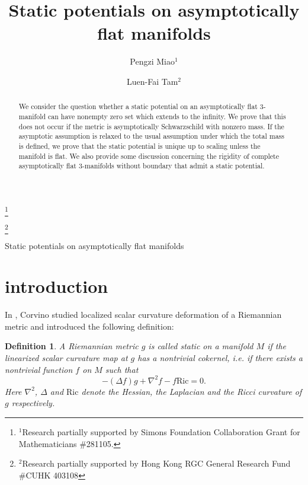 \documentclass[12pt]{amsart}
\newtheorem{definition}{Definition}
\theoremstyle{remark}
\numberwithin{equation}{section}
\newcommand{\Ric}{\mbox{Ric}}
\newcommand{\be}{\begin{equation}}
\newcommand{\ee}{\end{equation}}
\begin{document}
\title[]{Static potentials on asymptotically \\
flat manifolds}

\author{Pengzi Miao$^1$}
\address[Pengzi Miao]{Department of Mathematics, University of Miami, Coral Gables, FL 33146, USA.}
\thanks{$^1$Research partially supported by Simons Foundation Collaboration Grant for Mathematicians \#281105.}

\author{Luen-Fai Tam$^2$}
\address[Luen-Fai Tam]{The Institute of Mathematical Sciences and Department of
 Mathematics, The Chinese University of Hong Kong, Shatin, Hong Kong, China.}
\thanks{$^2$Research partially supported by Hong Kong RGC General Research Fund  \#CUHK 403108}

\renewcommand{\subjclassname}{
  \textup{2010} Mathematics Subject Classification}


\begin{abstract}
We consider the question whether a static potential on an asymptotically flat $3$-manifold
 can have nonempty zero set which extends to  the infinity.
 We prove that this does not occur if  the metric is asymptotically Schwarzschild with nonzero mass.
If the asymptotic assumption is relaxed to the usual assumption under which
the total mass is defined, we  prove that the static potential is unique up to scaling
unless the manifold is flat.
We also provide  some discussion concerning  the rigidity
of complete  asymptotically flat 3-manifolds without boundary  that  admit  a static potential.
\end{abstract}

\maketitle

{Static potentials on asymptotically flat manifolds}

\section{introduction}

In \cite{Corvino}, Corvino studied localized scalar curvature deformation of a Riemannian metric
and introduced the following definition:

\begin{definition}\label{df-static}
A Riemannian metric $g$ is called {\em static} on a manifold $M$ if the linearized scalar
curvature map  at $g$ has a nontrivial cokernel,
i.e. if there exists a nontrivial function $f$ on $M$ such that
\be \label{eq-static-c}
- (\Delta f) g  + \nabla^2 f - f \Ric  = 0 .
\ee
Here $\nabla^2$, $\Delta $ and $\Ric$ denote   the Hessian, the Laplacian and the Ricci curvature of $g$ respectively.
\end{definition}
\end{document}

